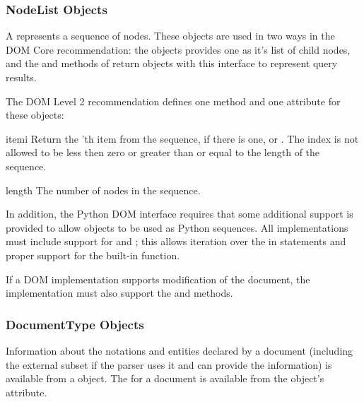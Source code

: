 \subsubsection{NodeList Objects \label{dom-nodelist-objects}}

A  represents a sequence of nodes.  These objects are
used in two ways in the DOM Core recommendation:  the
 objects provides one as it's list of child nodes, and
the  and
 methods of  return
objects with this interface to represent query results.

The DOM Level 2 recommendation defines one method and one attribute
for these objects:

\begin{methoddesc}[NodeList]{item}{i}
  Return the 'th item from the sequence, if there is one, or
  .  The index  is not allowed to be less then zero
  or greater than or equal to the length of the sequence.
\end{methoddesc}

\begin{memberdesc}[NodeList]{length}
  The number of nodes in the sequence.
\end{memberdesc}

In addition, the Python DOM interface requires that some additional
support is provided to allow  objects to be used as
Python sequences.  All  implementations must include
support for  and ; this allows
iteration over the  in  statements and
proper support for the  built-in function.

If a DOM implementation supports modification of the document, the
 implementation must also support the
 and  methods.


\subsubsection{DocumentType Objects \label{dom-documenttype-objects}}

Information about the notations and entities declared by a document
(including the external subset if the parser uses it and can provide
the information) is available from a  object.  The
 for a document is available from the
 object's  attribute.

